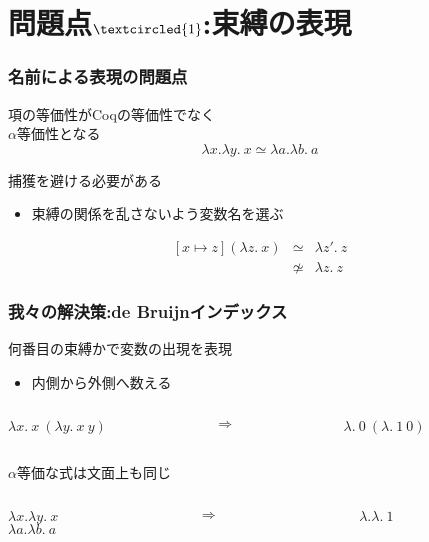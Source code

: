 \documentclass[dvipdfmx,cjk,xcolor=dvipsnames,envcountsect,notheorems,12pt]{beamer}
\theoremstyle{definition}
\begin{document}
\section{問題点$\textcircled{\footnotesize 1}$:束縛の表現}

\begin{frame}
	\frametitle{名前による表現の問題点}
	\LARGE 項の等価性がCoqの等価性でなく\\$\alpha$等価性となる
	\[ \lambda x.\lambda y.~x \simeq \lambda a.\lambda b.~a \]

	\vfill

	捕獲を避ける必要がある
	\begin{itemize}
		\item 束縛の関係を乱さないよう変数名を選ぶ
	\end{itemize}
	\[
		\begin{array}{lcl}
			[x \mapsto z](\lambda z.~x) & \simeq & \lambda z'.~z \\
																	& \not \simeq & \lambda z.~z
		\end{array}
	\]
\end{frame}

\begin{frame}
	\frametitle{我々の解決策:de Bruijnインデックス}
	\LARGE
	何番目の束縛かで変数の出現を表現
	\begin{itemize}
		\item 内側から外側へ数える
	\end{itemize}
	\begin{columns}
		\begin{column}{0.4\textwidth}
			$\lambda x.~x~(\lambda y.~x~y)$
		\end{column}
		\begin{column}{0.1\textwidth}
			$\Rightarrow$
		\end{column}
		\begin{column}{0.4\textwidth}
			$\lambda.~0~(\lambda.~1~0)$
		\end{column}
	\end{columns}

	\vfill

	$\alpha$等価な式は文面上も同じ
	\begin{columns}
		\begin{column}{0.4\textwidth}
			\begin{center}
				$\lambda x.\lambda y.~x$\\
				$\lambda a.\lambda b.~a$
			\end{center}
		\end{column}
		\begin{column}{0.1\textwidth}
			$\Rightarrow$
		\end{column}
		\begin{column}{0.4\textwidth}
			$\lambda.\lambda.~1$
		\end{column}
	\end{columns}
\end{frame}
\end{document}

